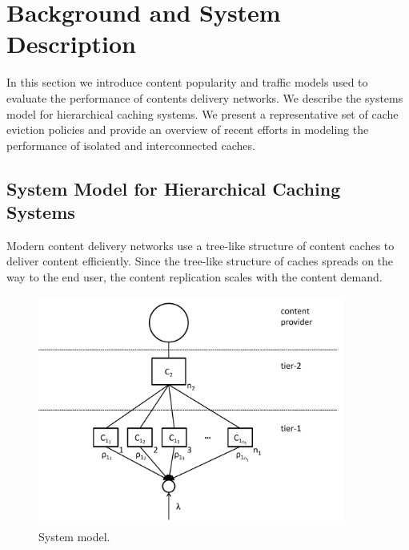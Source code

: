 \section{Background and System Description}\label{sec:hierarchical:related_work}

In this section we introduce content popularity and traffic models used to evaluate the performance of contents delivery networks.
We describe the systems model for hierarchical caching systems.
We present a representative set of cache eviction policies and provide an overview of recent efforts in modeling the performance of isolated and interconnected caches.

\subsection{System Model for Hierarchical Caching Systems}\label{sec:hierarchical:system_model}

Modern content delivery networks use a tree-like structure of content caches to deliver content efficiently.
Since the tree-like structure of caches spreads on the way to the end user, the content replication scales with the content demand.

\begin{figure}[tb]
\centering
\includegraphics[width=0.9\textwidth]{hierarchical/analyticbw/figures/hcmodeln1}
\caption{System model.}
\label{fig:hcmodel}
\end{figure}


